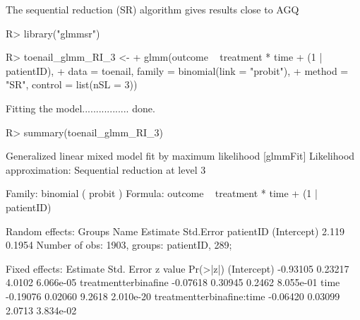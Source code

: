 \documentclass[article,nojss,shortnames]{jss}\usepackage[]{graphicx}\usepackage[]{xcolor}
\begin{document}
The sequential reduction (SR) algorithm \citep{ogden_2015} gives results close to
AGQ
\begin{Schunk}
\begin{Sinput}
R> library("glmmsr")
\end{Sinput}
\end{Schunk}
\begin{Schunk}
\begin{Sinput}
R> toenail_glmm_RI_3 <- 
+      glmm(outcome ~ treatment * time + (1 | patientID),
+           data = toenail, family = binomial(link = "probit"), 
+           method = "SR", control = list(nSL = 3))
\end{Sinput}
\begin{Soutput}
Fitting the model................. done.
\end{Soutput}
\begin{Sinput}
R> summary(toenail_glmm_RI_3)
\end{Sinput}
\begin{Soutput}
Generalized linear mixed model fit by maximum likelihood [glmmFit] 
Likelihood approximation: Sequential reduction at level 3 
 
Family: binomial ( probit ) 
Formula: outcome ~ treatment * time + (1 | patientID)

Random effects:
 Groups    Name        Estimate Std.Error
 patientID (Intercept) 2.119    0.1954   
Number of obs: 1903, groups: patientID, 289; 

Fixed effects: 
                          Estimate Std. Error z value  Pr(>|z|)
(Intercept)               -0.93105    0.23217  4.0102 6.066e-05
treatmentterbinafine      -0.07618    0.30945  0.2462 8.055e-01
time                      -0.19076    0.02060  9.2618 2.010e-20
treatmentterbinafine:time -0.06420    0.03099  2.0713 3.834e-02
\end{Soutput}
\end{Schunk}
\end{document}
